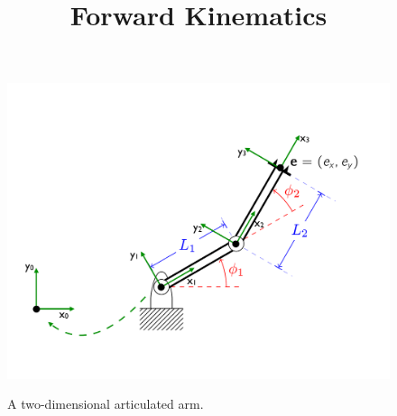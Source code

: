 \documentclass[12pt,letter]{article}
\title{{\bf Forward Kinematics}}
\date{}
\begin{document}
\maketitle
\vspace{-1.0in}





\begin{figure}[ht]
	\begin{center}
			{\includegraphics[width=.80\textwidth]{figs/robotArm01}}
	\end{center}
	\caption{A two-dimensional articulated arm. }
	\label{frames01}
\end{figure}
\end{document}
